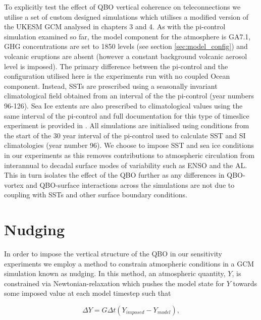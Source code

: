 To explicitly test the effect of QBO vertical coherence on teleconnections we utilise a set of custom designed simulations which utilises a modified version of the UKESM GCM analysed in chapters 3 and 4. As with the pi-control simulation examined so far, the model component for the atmosphere is GA7.1, GHG concentrations are set to 1850 levels (see section \ref{sec:model_config}) and volcanic eruptions are absent (however a constant background volcanic aerosol level is imposed). The primary difference between the pi-control and the configuration utilised here is the experiments run with no coupled Ocean component. Instead, SSTs are prescribed using a seasonally invariant climatological field obtained from an interval of the the pi-control (year numbers 96-126). Sea Ice extents are also prescribed to climatological values using the same interval of the pi-control and full documentation for this type of timeslice experiment is provided in \cite{oconnorAssessment2021}. All simulations are initialised using conditions from the start of the 30 year interval of the pi-control used to calculate SST and SI climatologies (year number 96). We choose to impose SST and sea ice conditions in our experiments as this removes contributions to atmospheric circulation from interannual to decadal surface modes of variability such as ENSO and the AL. This in turn isolates the effect of the QBO further as any differences in QBO-vortex and QBO-surface interactions across the simulations are not due to coupling with SSTs and other surface boundary conditions.  %

\section*{Nudging}
In order to impose the vertical structure of the QBO in our sensitivity experiments we employ a method to constrain atmospheric conditions in a GCM simulation known as nudging. In this method, an atmospheric quantity, $Y$, is constrained via Newtonian-relaxation which pushes the model state for $Y$ towards some imposed value at each model timestep such that

\begin{equation} \label{eq:nudging}
\Delta Y = G \Delta t (Y_{imposed} - Y_{model}), 
\end{equation}

